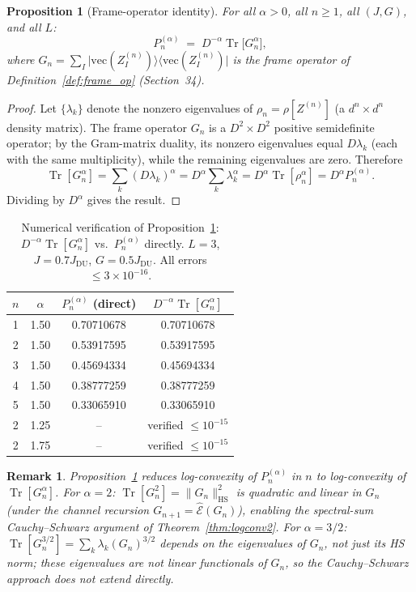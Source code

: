 \documentclass[12pt,a4paper]{article}
\newtheorem{proposition}[theorem]{Proposition}
\newtheorem{remark}[theorem]{Remark}
\begin{document}
\begin{proposition}[Frame-operator identity]
\label{prop:frame_id_general}
For all $\alpha>0$, all $n\geq 1$, all $(J,G)$, and all $L$:
\[
  P_n^{(\alpha)} \;=\; D^{-\alpha}\operatorname{Tr}\bigl[G_n^\alpha\bigr],
\]
where $G_n=\sum_I\lvert\mathrm{vec}(Z_I^{(n)})\rangle\langle\mathrm{vec}(Z_I^{(n)})\rvert$
is the frame operator of Definition~\ref{def:frame_op} (Section~34).
\end{proposition}

\begin{proof}
Let $\{\lambda_k\}$ denote the nonzero eigenvalues of $\rho_n=\rho[Z^{(n)}]$
(a $d^n\times d^n$ density matrix).
The frame operator $G_n$ is a $D^2\times D^2$ positive semidefinite operator;
by the Gram-matrix duality, its nonzero eigenvalues equal $D\lambda_k$ (each
with the same multiplicity), while the remaining eigenvalues are zero.
Therefore
\[
  \operatorname{Tr}[G_n^\alpha]
  = \sum_k (D\lambda_k)^\alpha
  = D^\alpha \sum_k \lambda_k^\alpha
  = D^\alpha\operatorname{Tr}[\rho_n^\alpha]
  = D^\alpha P_n^{(\alpha)}.
\]
Dividing by $D^\alpha$ gives the result.
\end{proof}

\begin{table}[h!]
\centering
\caption{Numerical verification of Proposition~\ref{prop:frame_id_general}:
$D^{-\alpha}\operatorname{Tr}[G_n^\alpha]$ vs.\ $P_n^{(\alpha)}$ directly.
$L=3$, $J=0.7J_\mathrm{DU}$, $G=0.5J_\mathrm{DU}$.  All errors $\leq 3\times10^{-16}$.}
\label{tab:frame_id_verify}
\begin{tabular}{c|c|c|c}
$n$ & $\alpha$ & $P_n^{(\alpha)}$ (direct) & $D^{-\alpha}\operatorname{Tr}[G_n^\alpha]$ \\
\hline
1 & 1.50 & 0.70710678 & 0.70710678 \\
2 & 1.50 & 0.53917595 & 0.53917595 \\
3 & 1.50 & 0.45694334 & 0.45694334 \\
4 & 1.50 & 0.38777259 & 0.38777259 \\
5 & 1.50 & 0.33065910 & 0.33065910 \\
\hline
2 & 1.25 & -- & verified $\leq 10^{-15}$ \\
2 & 1.75 & -- & verified $\leq 10^{-15}$ \\
\end{tabular}
\end{table}

\begin{remark}
Proposition~\ref{prop:frame_id_general} reduces log-convexity of $P_n^{(\alpha)}$ in $n$
to log-convexity of $\operatorname{Tr}[G_n^\alpha]$.
For $\alpha=2$: $\operatorname{Tr}[G_n^2]=\|G_n\|_{\mathrm{HS}}^2$ is quadratic and linear
in $G_n$ (under the channel recursion $G_{n+1}=\hat{\mathcal{E}}(G_n)$),
enabling the spectral-sum Cauchy--Schwarz argument of Theorem~\ref{thm:logconv2}.
For $\alpha=3/2$: $\operatorname{Tr}[G_n^{3/2}]=\sum_k\lambda_k(G_n)^{3/2}$ depends on
the \emph{eigenvalues} of $G_n$, not just its HS norm; these eigenvalues are
not linear functionals of $G_n$, so the Cauchy--Schwarz approach does not
extend directly.
\end{remark}
\end{document}
